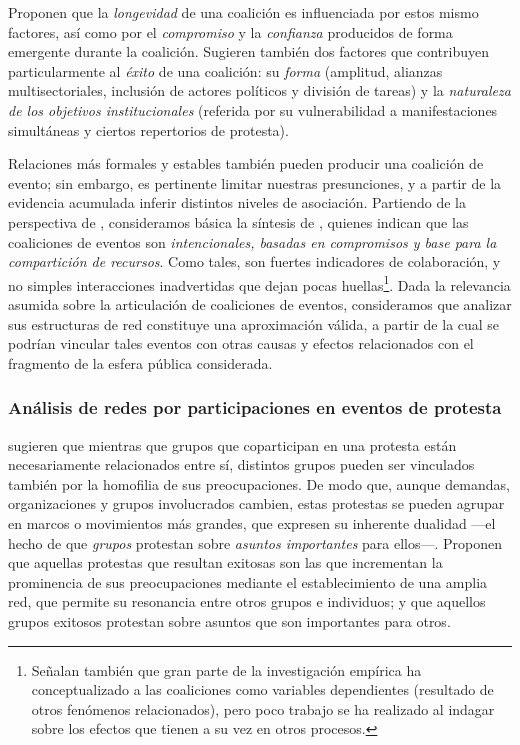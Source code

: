 \documentclass[letterpaper, 11pt]{book}
\theoremstyle{definition}
\theoremstyle{remark}
\begin{document}
Proponen que la \emph{longevidad} de una coalición es influenciada por estos mismo factores, así como por el \emph{compromiso} y la \emph{confianza} producidos de forma emergente durante la coalición. 
Sugieren también dos factores que contribuyen particularmente al \emph{éxito} de una coalición: su \emph{forma} (amplitud, alianzas multisectoriales, inclusión de actores políticos y división de tareas) y la \emph{naturaleza de los objetivos institucionales} (referida por su vulnerabilidad a manifestaciones simultáneas y ciertos repertorios de protesta). 



Relaciones más formales y estables también pueden producir una coalición de evento; sin embargo, es pertinente limitar nuestras presunciones, y a partir de la evidencia acumulada inferir distintos niveles de asociación. 
Partiendo de la perspectiva de \citet{2006_LevyMurphy_coparticipacion}, consideramos básica la síntesis de \citet{2012_Wand_andSoule_ColabiracionOMS}, quienes indican que las coaliciones de eventos son \emph{intencionales, basadas en compromisos y base para la compartición de recursos}. 
Como tales, son fuertes indicadores de colaboración, y no simples interacciones inadvertidas que dejan pocas huellas\footnote{
    Señalan también que gran parte de la investigación empírica ha conceptualizado a las coaliciones como variables dependientes (resultado de otros fenómenos relacionados), pero poco trabajo se ha realizado al indagar sobre los efectos que tienen a su vez en otros procesos.
}. 
Dada la relevancia asumida sobre la articulación de coaliciones de eventos, consideramos que analizar sus estructuras de red constituye una aproximación válida, a partir de la cual se podrían vincular tales eventos con otras causas y efectos relacionados con el fragmento de la esfera pública considerada. 






\subsubsection{Análisis de redes por participaciones en eventos de protesta}
\label{subsubsec:RedesCoparticipacion}


\citet{1993_BrmanEvtt_StructureSocialProtest} sugieren que mientras que grupos que coparticipan en una protesta están necesariamente relacionados entre sí, distintos grupos pueden ser vinculados también por la homofilia de sus preocupaciones. 
De modo que, aunque demandas, organizaciones y grupos involucrados cambien, estas protestas se pueden agrupar en marcos o movimientos más grandes, que expresen su inherente dualidad ---el hecho de que \emph{grupos} protestan sobre \emph{asuntos importantes} para ellos---. 
Proponen que aquellas protestas que resultan exitosas son las que incrementan la prominencia de sus preocupaciones mediante el establecimiento de una amplia red, que permite su resonancia entre otros grupos e individuos; y que aquellos grupos exitosos protestan sobre asuntos que son importantes para otros. 
\end{document}
